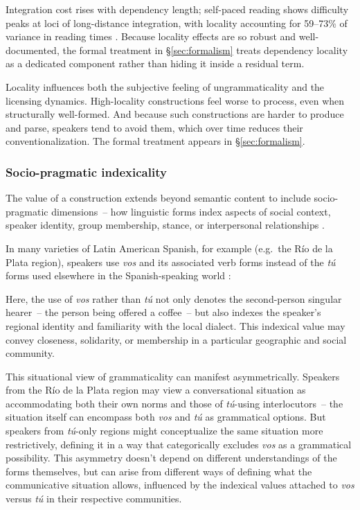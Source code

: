 \documentclass[12pt,letterpaper]{article}
\newcommand{\olang}[1]{\textit{#1}}
\begin{document}
Integration cost rises with dependency length; self-paced reading shows difficulty peaks at loci of long-distance integration, with locality accounting for 59--73\% of variance in reading times \autocite{GrodnerGibson2005}. Because locality effects are so robust and well-documented, the formal treatment in \S\ref{sec:formalism} treats dependency locality as a dedicated component rather than hiding it inside a residual term.

Locality influences both the subjective feeling of ungrammaticality and the licensing dynamics. High-locality constructions feel worse to process, even when structurally well-formed. And because such constructions are harder to produce and parse, speakers tend to avoid them, which over time reduces their conventionalization. The formal treatment appears in \S\ref{sec:formalism}.

\subsubsection{Socio-pragmatic indexicality}\label{sec:socio-indexical}

The value of a construction extends beyond semantic content to include socio-pragmatic dimensions~-- how linguistic forms index aspects of social context, speaker identity, group membership, stance, or interpersonal relationships \autocite{Eckert2012, Silverstein1976}.

In many varieties of Latin American Spanish, for example (e.g.\, the Río de la Plata region), speakers use \olang{vos} and its associated verb forms instead of the \olang{tú} forms used elsewhere in the Spanish-speaking world \autocite{bertolotti2016}:

\z

Here, the use of \olang{vos} rather than \olang{tú} not only denotes the second-person singular hearer~-- the person being offered a coffee~-- but also indexes the speaker's regional identity and familiarity with the local dialect. This indexical value may convey closeness, solidarity, or membership in a particular geographic and social community.

This situational view of grammaticality can manifest asymmetrically. Speakers from the Río de la Plata region may view a conversational situation as accommodating both their own norms and those of \olang{tú}-using interlocutors~--  the situation itself can encompass both \olang{vos} and \olang{tú} as grammatical options. But speakers from \olang{tú}-only regions might conceptualize the same situation more restrictively, defining it in a way that categorically excludes \olang{vos} as a grammatical possibility. This asymmetry doesn't depend on different understandings of the forms themselves, but can arise from different ways of defining what the communicative situation allows, influenced by the indexical values attached to \olang{vos} versus \olang{tú} in their respective communities.
\end{document}
